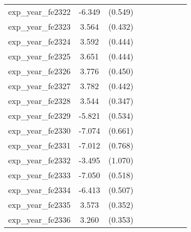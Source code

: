 {\begin{tabular}{l*{4}{cc}}
exp\_year\_fe2322&   -6.349\sym{***}&  (0.549)&                  &         &                  &         &                  &         \\
exp\_year\_fe2323&    3.564\sym{***}&  (0.432)&                  &         &                  &         &                  &         \\
exp\_year\_fe2324&    3.592\sym{***}&  (0.444)&                  &         &                  &         &                  &         \\
exp\_year\_fe2325&    3.651\sym{***}&  (0.444)&                  &         &                  &         &                  &         \\
exp\_year\_fe2326&    3.776\sym{***}&  (0.450)&                  &         &                  &         &                  &         \\
exp\_year\_fe2327&    3.782\sym{***}&  (0.442)&                  &         &                  &         &                  &         \\
exp\_year\_fe2328&    3.544\sym{***}&  (0.347)&                  &         &                  &         &                  &         \\
exp\_year\_fe2329&   -5.821\sym{***}&  (0.534)&                  &         &                  &         &                  &         \\
exp\_year\_fe2330&   -7.074\sym{***}&  (0.661)&                  &         &                  &         &                  &         \\
exp\_year\_fe2331&   -7.012\sym{***}&  (0.768)&                  &         &                  &         &                  &         \\
exp\_year\_fe2332&   -3.495\sym{**} &  (1.070)&                  &         &                  &         &                  &         \\
exp\_year\_fe2333&   -7.050\sym{***}&  (0.518)&                  &         &                  &         &                  &         \\
exp\_year\_fe2334&   -6.413\sym{***}&  (0.507)&                  &         &                  &         &                  &         \\
exp\_year\_fe2335&    3.573\sym{***}&  (0.352)&                  &         &                  &         &                  &         \\
exp\_year\_fe2336&    3.260\sym{***}&  (0.353)&                  &         &                  &         &                  &         \\

\end{tabular}}
